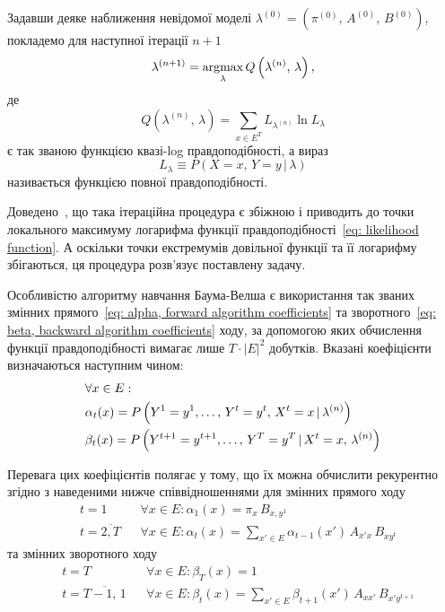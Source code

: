 Задавши деяке наближення невідомої моделі $\lambda^{(0)}=(\pi^{(0)},\,A^{(0)},\,B^{(0)})$, покладемо для наступної ітерації $n+1$
\begin{equation*}
    \lambda^{(n+1)} = \operatorname*{argmax}\limits_{\lambda} Q\left( \lambda^{(n)},\,\lambda \right),
\end{equation*}
де
\begin{equation}\label{eq: Q quasi-log likelihood function}
    Q\left( \lambda^{(n)},\,\lambda \right) = \sum\limits_{x \in E^T}L_{\lambda^{(n)}} \ln L_{\lambda}
\end{equation}
є так званою функцією квазі-log правдоподібності, а вираз
\begin{equation*}
    L_{\lambda} \equiv P\left( X=x,\,Y=y \,|\, \lambda \right)
\end{equation*}
називається функцією повної правдоподібності.

Доведено~\cite[розділ 4]{Koski2001}, що така ітераційна процедура є збіжною і приводить до точки локального максимуму логарифма функції правдоподібності~\eqref{eq: likelihood function}. А оскільки точки екстремумів довільної функції та її логарифму збігаються, ця процедура розв'язує поставлену задачу.

Особливістю алгоритму навчання Баума-Велша є використання так званих змінних прямого~\eqref{eq: alpha, forward algorithm coefficients} та зворотного~\eqref{eq: beta, backward algorithm coefficients} ходу, за допомогою яких обчислення функції правдоподібності вимагає лише $T\cdot|E|^2$ добутків. Вказані коефіцієнти визначаються наступним чином:
\begin{align}
    & \forall x \in E: \notag \\
    & \alpha_t(x) = P\left( Y^1=y^1,\ldots,\,Y^t=y^t,\,X^t=x \,|\, \lambda^{(n)} \right) \label{eq: alpha, forward algorithm coefficients} \\
    & \beta_t(x) = P\left( Y^{t+1}=y^{t+1},\ldots,\,Y^T=y^T \,|\, X^t=x,\, \lambda^{(n)} \right) \label{eq: beta, backward algorithm coefficients}
\end{align}

Перевага цих коефіцієнтів полягає у тому, що їх можна обчислити рекурентно~\cite[розділ 5]{Nilsson2005} згідно з наведеними нижче співвідношеннями для змінних прямого ходу
\begin{align*}
    & t = 1              && \forall x \in E: \alpha_1(x)=\pi_{x}\,B_{x,y^1} \\
    & t = \overline{2,T} && \forall x \in E: \alpha_{t}(x)=\sum\limits_{x'\in E}\alpha_{t-1}(x')\,A_{x'x}\,B_{xy^{t}} 
\end{align*}
та змінних зворотного ходу
\begin{align*}
    & t = T                  && \forall x \in E: \beta_T(x)=1 \\
    & t = \overline{T-1,\,1} && \forall x \in E: \beta_t(x)=\sum\limits_{x' \in E}\beta_{t+1}(x')\,A_{x x'}\,B_{x'y^{t+1}}
\end{align*}

